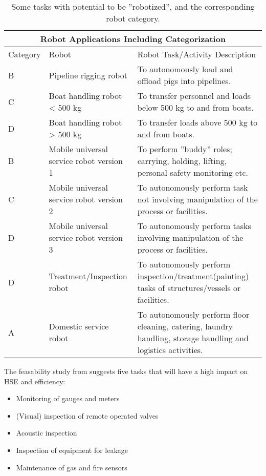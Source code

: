 \begin{table}
\centering
\begin{tabular}{ |p{2cm} p{3cm} p{5cm}| }
\hline
\multicolumn{3}{|c|}{Robot Applications Including Categorization}\\
\hline\hline
Category & Robot & Robot Task/Activity Description \\ 
\hline
B & Pipeline rigging robot & To autonomously load and offload pigs into pipelines. \\
C & Boat handling robot < 500 kg & To transfer personnel and loads below 500 kg to and from boats.\\
D & Boat handling robot > 500 kg & To transfer loads above 500 kg to and from boats.\\
\hline
B & Mobile universal service robot version 1 & To perform ''buddy'' roles; carrying, holding, lifting, personal safety monitoring etc. \\
C & Mobile universal service robot version 2 & To autonomously perform task not involving manipulation of the process or facilities.\\
D & Mobile universal service robot version 3 & To autonomously perform tasks involving manipulation of the process or facilities. \\
D & Treatment/Inspection robot & To autonomously perform inspection/treatment(painting) tasks of structures/vessels or facilities.\\
\hline
A & Domestic service robot & To autonomously perform floor cleaning, catering, laundry handling, storage handling and logistics activities. \\
\hline\hline 
\end{tabular}
\caption{Some tasks with potential to be ''robotized'', and the corresponding robot category\cite{6094661}.} 
\label{tab:tasks_capabilities}
\end{table}

The feasability study from \cite{6094661} suggests five tasks that will have a high impact on \ac{HSE} and efficiency:
\begin{itemize}
\item Monitoring of gauges and meters
\item (Visual) inspection of remote operated valves
\item Acoustic inspection
\item Inspection of equipment for leakage
\item Maintenance of gas and fire sensors
\end{itemize}

